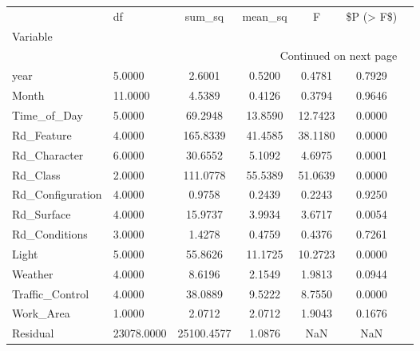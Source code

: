 \begin{longtable}{p{6cm}lccccc}
\toprule
{} &         df &     sum\_sq &  mean\_sq &       F &  \$P (> F\$) \\
Variable         &            &            &          &         &            \\
\midrule
\endhead
\midrule
\multicolumn{6}{r}{{Continued on next page}} \\
\midrule
\endfoot

\bottomrule
\endlastfoot
year             &     5.0000 &     2.6001 &   0.5200 &  0.4781 &     0.7929 \\
Month            &    11.0000 &     4.5389 &   0.4126 &  0.3794 &     0.9646 \\
Time\_of\_Day      &     5.0000 &    69.2948 &  13.8590 & 12.7423 &     0.0000 \\
Rd\_Feature       &     4.0000 &   165.8339 &  41.4585 & 38.1180 &     0.0000 \\
Rd\_Character     &     6.0000 &    30.6552 &   5.1092 &  4.6975 &     0.0001 \\
Rd\_Class         &     2.0000 &   111.0778 &  55.5389 & 51.0639 &     0.0000 \\
Rd\_Configuration &     4.0000 &     0.9758 &   0.2439 &  0.2243 &     0.9250 \\
Rd\_Surface       &     4.0000 &    15.9737 &   3.9934 &  3.6717 &     0.0054 \\
Rd\_Conditions    &     3.0000 &     1.4278 &   0.4759 &  0.4376 &     0.7261 \\
Light            &     5.0000 &    55.8626 &  11.1725 & 10.2723 &     0.0000 \\
Weather          &     4.0000 &     8.6196 &   2.1549 &  1.9813 &     0.0944 \\
Traffic\_Control  &     4.0000 &    38.0889 &   9.5222 &  8.7550 &     0.0000 \\
Work\_Area        &     1.0000 &     2.0712 &   2.0712 &  1.9043 &     0.1676 \\
Residual         & 23078.0000 & 25100.4577 &   1.0876 &     NaN &        NaN \\
\end{longtable}

